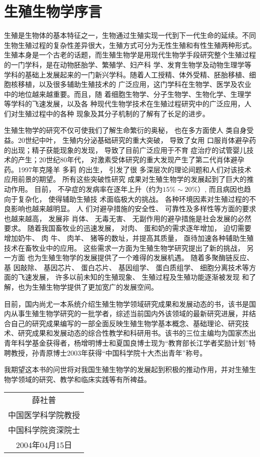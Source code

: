 \chapter{生殖生物学序言}

生殖是生物体的基本特征之一，生物通过生殖实现一代到下一代生命的延续。不同生物生殖过程的复杂性差异很大，生殖方式可分为无性生殖和有性生殖两种形式。生殖本身是一个古老的话题，而生殖生物学是用现代生物学手段研究整个生殖过程的一门学科，是在动物胚胎学、繁殖学、妇产科 学、发育生物学及动物生理学等学科的基础上发展起来的一门新兴学科。随着人工授精、体外受精、胚胎移植、细胞核移植，以及很多辅助生殖技术的 广泛应用，这门学科在生物学、医学及农业中的地位越来越重要。而且，随 着细胞生物学、分子生物学、生物化学、生理学等学科的飞速发展，以及各 种现代生物学技术在生殖过程研究中的广泛应用，人们对生殖过程中的各种 现象及其分子机制的了解有了长足的进步。

生殖生物学的研究不仅可使我们了解生命繁衍的奥秘， 也在多方面使人
类自身受益。20世纪中叶， 生殖内分泌基础研究的重大突破， 导致了女用 口服肖体避孕药的出现；精子获能现象的发现， 导致了目前广泛应用于不育 症治疗的试管婴儿技术的产生；20世纪80年代， 对激素受体研究的重大发现产生了第二代肖体避孕药。1997年克隆羊 多莉 的出生， 引发了很 多深层次的理论间题和人们对该技术应用前景的期望。 所有这些突破性研究 成果对生殖生物学的发展起到了巨大的推动作用。 目前， 不孕症的发病率在逐年上升（约为$ 15\% \sim 20\% $）, 而且病因也趋向于复杂化， 使得辅助生殖技 术面临极大的挑战。 各种环境因素对生殖过程的不良影响也越来越明显。 人 们对避孕措施的安全性、 可靠性及多样性等方面的要求也越来越高， 发展非 肖体、 无毒无害、 无副作用的避孕措施是社会发展的必然要求。 随着我国畜牧业的迅速发展， 对肉、 蛋和奶的需求逐年增加， 迫切需要增加奶牛、 肉 牛、 肉羊、 猪等的数址，并提高其质量， 亟待加速各种辅助生殖技术在畜牧业中的应用。 这些需求一方面为生殖生物学研究提出了新的挑战， 另一方面 也为生殖生物学的发展提供了一个难得的发展机遇。 随着多聚酶链反应、 基 因敲除、 基因芯片、 蛋白芯片、 基因组学、 蛋白质组学、 细胞分离技术等方 面的飞速发展， 许多以前未知的生殖现象、 生殖过程及生殖功能逐渐被发现 和了解，也为生殖生物学提供了更加宽广的发展空间。

目前，国内尚尤一本系统介绍生殖生物学领域研究成果和发展动态的书，该书是国内从事生殖生物学研究的一批学者，综述当前国内外该领域的最新研究进展，并结合自己的研究成果编写的一部全面反映生殖生物学基本概念、基础理论、研究技术、研究成果和发展动态的综合性教学和科研用书。该书的三位主编均为国家杰出青年科学基金获得者，杨增明博士和夏国良博士现为“教育部长江学者奖励计划”特聘教授，孙青原博士2003年获得“中国科学院十大杰出青年”称号。

我期望这本书的问世将对我国生殖生物学的发展起到积极的推动作用，并对生殖生物学领域的研究、教学和临床实践等有所裨益。

\begin{flushright}
\kaishu 
\begin{tabular}{c}
{\huge 薛社普}\\  
中国医学科学院教授 \\  
中国科学院资深院士 \\  
2004年04月15日 \\  
\end{tabular} 
\end{flushright}